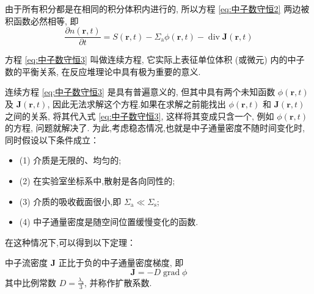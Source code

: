\documentclass{Sichuan Normal University}
\begin{document}
由于所有积分都是在相同的积分体积内进行的, 所以方程 \eqref{eq:中子数守恒2} 两边被积函数必然相等, 即
\begin{equation}
    \frac{\partial n(\boldsymbol{r}, t)}{\partial t}=S(\boldsymbol{r}, t)-\Sigma_{\mathrm{a}} \phi(\boldsymbol{r}, t)-\operatorname{div} \boldsymbol{J}(\boldsymbol{r}, t)
    \label{eq:中子数守恒3}
\end{equation}

方程 \eqref{eq:中子数守恒3} 叫做连续方程, 它实际上表征单位体积 (或微元) 内的中子数的平衡关系, 在反应堆理论中具有极为重要的意义.

连续方程 \eqref{eq:中子数守恒3} 是具有普遍意义的, 但其中具有两个未知函数 $\phi(\boldsymbol{r}, t)$ 及 $\boldsymbol{J}(\boldsymbol{r}, t)$, 
因此无法求解这个方程.如果在求解之前能找出 $\phi(\boldsymbol{r}, t)$ 和 $\boldsymbol{J}(\boldsymbol{r}, t)$ 之间的关系, 将其代入式 \eqref{eq:中子数守恒3}, 这样将其变成只含一个, 例如 $\phi(\boldsymbol{r}, t)$ 的方程, 问题就解决了.
为此,考虑稳态情况,也就是中子通量密度不随时间变化时,同时假设以下条件成立：
    \begin{itemize}
        \item[] \hspace{1mm}(1) 介质是无限的、均匀的;
        \item[] \hspace{1mm}(2) 在实验室坐标系中,散射是各向同性的;
        \item[] \hspace{1mm}(3) 介质的吸收截面很小,即 $\Sigma_{\mathrm{a}} \ll \Sigma_{\mathrm{s}}$;
        \item[] \hspace{1mm}(4) 中子通量密度是随空间位置缓慢变化的函数.
    \end{itemize}
在这种情况下,可以得到以下定理：

\begin{theorem}[菲克定律]
    中子流密度 $\boldsymbol{J}$ 正比于负的中子通量密度梯度, 即
    \begin{equation}
    \boldsymbol{J}=-D \operatorname{grad} \phi
    \label{eq:菲克定律}
\end{equation}
    其中比例常数 $D=\frac{\lambda_{\mathrm{s}}}{3}$, 并称作扩散系数.
\end{theorem}
\end{document}
